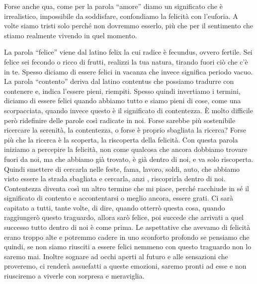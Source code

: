 \documentclass[12pt]{book} %
\begin{document}
\bigskip

Forse anche qua, come per la parola “amore” diamo un significato che è irrealistico, impossibile da soddisfare,
confondiamo la felicità con l'euforia. A volte siamo tristi solo perché non dovremmo esserlo, più
che per il sentimento che stiamo realmente vivendo in quel momento.


\bigskip

La parola “felice” viene dal latino felix la cui radice è fecundus, ovvero fertile. Sei felice sei fecondo o ricco di
frutti, realizzi la tua natura, tirando fuori ciò che c'è in te. Spesso diciamo di essere felici in vacanza che  invece significa periodo vacuo. 
La parola “contento” deriva dal latino contentus che possiamo tradurre con contenere e, indica l'essere pieni, riempiti. Spesso
quindi invertiamo i termini, diciamo di essere felici quando abbiamo tutto e siamo pieni di cose, come una
scorpacciata, quando invece questo è il significato di contentezza. È molto difficile però ridefinire delle parole così
radicate in noi. Forse sarebbe più sostenibile ricercare la serenità, la contentezza, o forse è proprio sbagliata la
ricerca? Forse più che la ricerca è la scoperta, la riscoperta della felicità. Con questa parola iniziamo a percepire
la felicità, non come qualcosa che ancora dobbiamo trovare fuori da noi, ma che abbiamo già trovato, è già dentro di
noi, e va solo riscoperta. Quindi smettere di cercarla nelle feste, fama, lavoro, soldi, auto, che abbiamo visto essere
la strada sbagliata e cercarla, anzi , riscoprirla dentro di noi. Contentezza diventa così un altro termine che mi
piace, perché racchiude in sé il significato di contento e accontentarsi o meglio ancora, essere grati. Ci sarà capitato a tutti, tante volte, di
dire, quando otterrò questa cosa, quando raggiungerò questo traguardo, allora sarò felice, poi succede che arrivati a
quel successo tutto dentro di noi è come prima. Le aspettative che avevamo di felicità erano troppo alte e potremmo
cadere in uno sconforto profondo se pensiamo che quindi, se non siamo riusciti a essere felici nemmeno con questo
traguardo non lo saremo mai. Inoltre sognare ad occhi aperti al futuro e alle sensazioni che proveremo, ci renderà
assuefatti a queste emozioni, saremo pronti ad esse e non riusciremo a viverle con sorpresa e meraviglia. 
\end{document}
